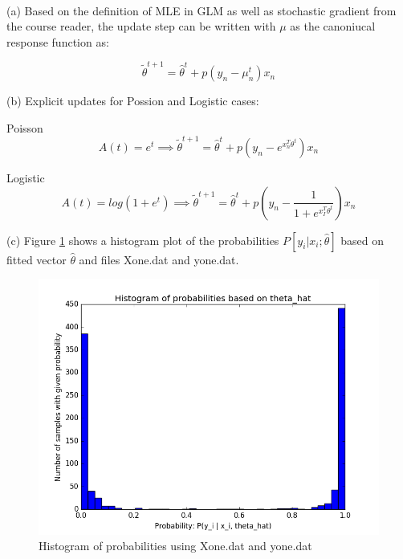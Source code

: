 \documentclass[11pt]{article}
\newenvironment{problem}[2][Problem]{\begin{trivlist}
\item[\hskip \labelsep {\bfseries #1}\hskip \labelsep {\bfseries #2.}]}{\end{trivlist}}
\begin{document}
\begin{problem}{2.4}
\text{ }\\

(a) Based on the definition of MLE in GLM as well as stochastic gradient from the course reader, the update step can be written with $\mu$ as the canoniucal response function as:

\[\tilde{\theta}^{t+1} = \hat{\theta}^{t} + p(y_{n}-\mu^{t}_{n})x_{n}\]

(b) Explicit updates for Possion and Logistic cases:

Poisson
\[A(t) = e^{t} \implies \tilde{\theta}^{t+1} = \hat{\theta}^{t} + p(y_{n}-e^{x^{T}_{n} \theta^{t}})x_{n}\]

Logistic
\[A(t) = log(1+e^{t}) \implies \tilde{\theta}^{t+1} = \hat{\theta}^{t} + p(y_{n}-\frac{1}{1+e^{x^{T}_{I}\theta^{t}}})x_{n}\]

(c) Figure \ref{fig:4c} shows a histogram plot of the probabilities $P[y_i | x_i;\hat{\theta}]$  based on fitted vector $\hat{\theta}$ and files Xone.dat and yone.dat.
\begin{figure}[h!]
  \centering
  \includegraphics[scale=0.5]{figs/4c_new.png}
  \caption{Histogram of probabilities using Xone.dat and yone.dat}
  \label{fig:4c}
\end{figure}


\end{problem}
\end{document}
